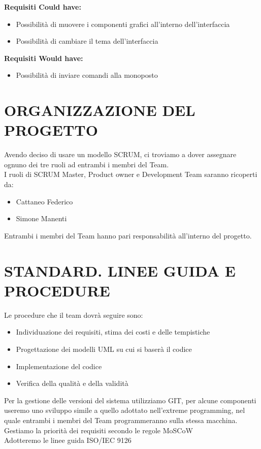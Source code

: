 \documentclass{report}
\begin{document}
\textbf{Requisiti Could have:}
\begin{itemize}
\item Possibilità di muovere i componenti grafici all'interno dell'interfaccia
\item Possibilità di cambiare il tema dell'interfaccia
\end{itemize}

\textbf{Requisiti Would have:}
\begin{itemize}
\item Possibilità di inviare comandi alla monoposto
\end{itemize}


\chapter{ORGANIZZAZIONE DEL PROGETTO}
Avendo deciso di usare un modello SCRUM, ci troviamo a dover assegnare ognuno dei tre ruoli ad entrambi i membri del Team.\\
I ruoli di SCRUM Master, Product owner e Development Team saranno ricoperti da:
\begin{itemize}
\item Cattaneo Federico
\item Simone Manenti
\end{itemize}
Entrambi i membri del Team hanno pari responsabilità all'interno del progetto.

\begingroup
\let\clearpage\relax
\chapter{STANDARD. LINEE GUIDA E PROCEDURE}
\endgroup

Le procedure che il team dovrà seguire sono:
\begin{itemize}
\item Individuazione dei requisiti, stima dei costi e delle tempistiche
\item Progettazione dei modelli UML su cui si baserà il codice
\item Implementazione del codice
\item Verifica della qualità e della validità
\end{itemize}
Per la gestione delle versioni del sistema utilizziamo GIT, per alcune componenti useremo uno sviluppo simile a quello adottato nell'extreme programming, nel quale entrambi i membri del Team programmeranno sulla stessa macchina.\\
Gestiamo la priorità dei requisiti secondo le regole MoSCoW\\
Adotteremo le linee guida ISO/IEC 9126
\end{document}
